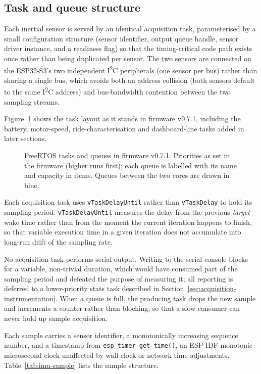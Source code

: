 \subsection{Task and queue structure}

Each inertial sensor is served by an identical acquisition task, parameterised by a small configuration structure (sensor identifier, output queue handle, sensor driver instance, and a readiness flag) so that the timing-critical code path exists once rather than being duplicated per sensor. The two sensors are connected on the ESP32-S3's two independent I\textsuperscript{2}C peripherals (one sensor per bus) rather than sharing a single bus, which avoids both an address collision (both sensors default to the same I\textsuperscript{2}C address) and bus-bandwidth contention between the two sampling streams.

Figure~\ref{fig:task-architecture} shows the task layout as it stands in firmware v0.7.1, including the battery, motor-speed, ride-characterisation and dashboard-line tasks added in later sections.

\begin{figure}[htbp]
\centering

\caption{FreeRTOS tasks and queues in firmware v0.7.1. Priorities as set in the firmware (higher runs first); each queue is labelled with its name and capacity in items. Queues between the two cores are drawn in blue.}
\label{fig:task-architecture}
\end{figure}

Each acquisition task uses \texttt{vTaskDelayUntil} rather than \texttt{vTaskDelay} to hold its sampling period. \texttt{vTaskDelayUntil} measures the delay from the previous \emph{target} wake time rather than from the moment the current iteration happens to finish, so that variable execution time in a given iteration does not accumulate into long-run drift of the sampling rate.

No acquisition task performs serial output. Writing to the serial console blocks for a variable, non-trivial duration, which would have consumed part of the sampling period and defeated the purpose of measuring it; all reporting is deferred to a lower-priority stats task described in Section~\ref{sec:acquisition-instrumentation}. When a queue is full, the producing task drops the new sample and increments a counter rather than blocking, so that a slow consumer can never hold up sample acquisition.

Each sample carries a sensor identifier, a monotonically increasing sequence number, and a timestamp from \texttt{esp\_timer\_get\_time()}, an ESP-IDF monotonic microsecond clock unaffected by wall-clock or network time adjustments. Table~\ref{tab:imu-sample} lists the sample structure.

